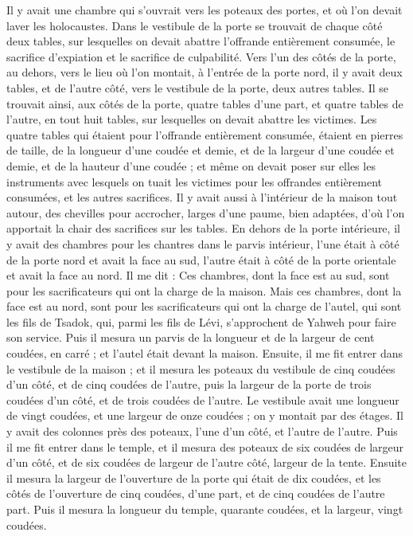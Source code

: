 \begin{multicols}{2}
Il y avait une chambre qui s’ouvrait vers les poteaux des portes, et où l’on devait laver les holocaustes.
Dans le vestibule de la porte se trouvait de chaque côté deux tables, sur lesquelles on devait abattre l’offrande entièrement consumée, le sacrifice d’expiation et le sacrifice de culpabilité.
Vers l'un des côtés de la porte, au dehors, vers le lieu où l'on montait, à l'entrée de la porte nord, il y avait deux tables, et de l'autre côté, vers le vestibule de la porte, deux autres tables.
Il se trouvait ainsi, aux côtés de la porte, quatre tables d’une part, et quatre tables de l’autre, en tout huit tables, sur lesquelles on devait abattre les victimes.
Les quatre tables qui étaient pour l’offrande entièrement consumée, étaient en pierres de taille, de la longueur d'une coudée et demie, et de la largeur d'une coudée et demie, et de la hauteur d'une coudée ; et même on devait poser sur elles les instruments avec lesquels on tuait les victimes pour les offrandes entièrement consumées, et les autres sacrifices.
Il y avait aussi à l’intérieur de la maison tout autour, des chevilles pour accrocher, larges d'une paume, bien adaptées, d'où l’on apportait la chair des sacrifices sur les tables.
En dehors de la porte intérieure, il y avait des chambres pour les chantres dans le parvis intérieur, l’une était à côté de la porte nord et avait la face au sud, l’autre était à côté de la porte orientale et avait la face au nord.
Il me dit : Ces chambres, dont la face est au sud, sont pour les sacrificateurs qui ont la charge de la maison.
Mais ces chambres, dont la face est au nord, sont pour les sacrificateurs qui ont la charge de l'autel, qui sont les fils de Tsadok, qui, parmi les fils de Lévi, s'approchent de Yahweh pour faire son service.
Puis il mesura un parvis de la longueur et de la largeur de cent coudées, en carré ; et l'autel était devant la maison.
Ensuite, il me fit entrer dans le vestibule de la maison ; et il mesura les poteaux du vestibule de cinq coudées d’un côté, et de cinq coudées de l’autre, puis la largeur de la porte de trois coudées d’un côté, et de trois coudées de l’autre.
Le vestibule avait une longueur de vingt coudées, et une largeur de onze coudées ; on y montait par des étages. Il y avait des colonnes près des poteaux, l’une d’un côté, et l’autre de l’autre.
\VerseOne{}Puis il me fit entrer dans le temple, et il mesura des poteaux de six coudées de largeur d'un côté, et de six coudées de largeur de l'autre côté, largeur de la tente.
Ensuite il mesura la largeur de l'ouverture de la porte qui était de dix coudées, et les côtés de l'ouverture de cinq coudées, d'une part, et de cinq coudées de l'autre part. Puis il mesura la longueur du temple, quarante coudées, et la largeur, vingt coudées.

\end{multicols}
